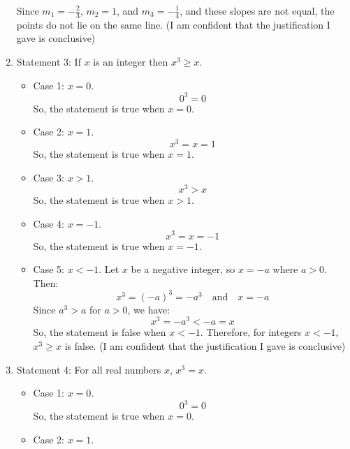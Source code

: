 \documentclass{article}
\begin{document}
\begin{enumerate}
          Since \(m_1 = -\frac{2}{3}\), \(m_2 = 1\), and \(m_3 = -\frac{1}{4}\), and these slopes are not equal, the points do not lie on the same line. (I am confident that the justification I gave is conclusive)
    \item Statement 3: If $x$ is an integer then $x^3 \geq x$.
          \begin{itemize}
              \item Case 1: $x = 0$.
                    \[
                        0^3 = 0
                    \]
                    So, the statement is true when $x=0$.
              \item Case 2: $x = 1$.
                    \[
                        x^3 = x = 1
                    \]
                    So, the statement is true when $x=1$.
              \item Case 3: $x > 1$.
                    \[
                        x^3 > x
                    \]
                    So, the statement is true when $x > 1$.
              \item Case 4: $x = -1$.
                    \[
                        x^3 = x = -1
                    \]
                    So, the statement is true when $x = -1$.
              \item Case 5: $x < -1$.\newline
                    Let \(x\) be a negative integer, so \(x = -a\) where \(a > 0\).
                    Then:
                    \[
                        x^3 = {(-a)}^3 = -a^3 \quad \text{and} \quad x = -a
                    \]
                    Since \(a^3 > a\) for \(a > 0\), we have:
                    \[
                        x^3 = -a^3 < -a = x
                    \]
                    So, the statement is false when $x < -1$.\newline
                    Therefore, for integers \(x < -1\), \(x^3 \geq x\) is false.\newline
                    (I am confident that the justification I gave is conclusive)
          \end{itemize}
    \item Statement 4: For all real numbers $x$, $x^3 = x$.
          \begin{itemize}
              \item Case 1: $x = 0$.
                    \[
                        0^3 = 0
                    \]
                    So, the statement is true when $x = 0$.
              \item Case 2: $x = 1$.

\end{itemize}
\end{enumerate}
\end{document}
